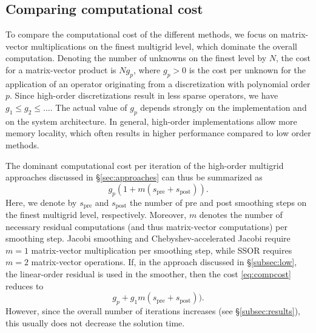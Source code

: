 \documentclass[smallcondensed,final]{svjour3}     %
\begin{document}
\subsection{Comparing computational cost}\label{subsec:complexity}
To compare the computational cost of the different methods, we focus
on matrix-vector multiplications on the finest multigrid level, which
dominate the overall computation. Denoting the number of unknowns on
the finest level by $N$, the cost for a matrix-vector product is
$Ng_p$, where $g_p>0$ is the cost per unknown for the application of
an operator originating from a discretization with polynomial order
$p$. Since high-order discretizations result in less sparse operators,
we have $g_1\le g_2\le \ldots$. The actual value of $g_p$ depends
strongly on the implementation and on the system architecture.
In general, high-order implementations allow more memory locality,
which often results in higher performance compared to low order
methods.

The dominant computational cost per iteration of the high-order
multigrid approaches discussed in \S\ref{sec:approaches} can
thus be summarized as
\begin{equation}\label{eq:compcost}
  g_p(1+m(s_\text{pre}+s_\text{post})).
\end{equation}
Here, we denote by $s_\text{pre}$ and $s_\text{post}$ the number of
pre and post smoothing steps on the finest multigrid level,
respectively. Moreover, $m$ denotes the number of necessary residual
computations (and thus matrix-vector computations) per smoothing step.
Jacobi smoothing and Chebyshev-accelerated Jacobi require $m=1$
matrix-vector multiplication per smoothing step, while SSOR requires
$m=2$ matrix-vector operations. If, in the approach discussed in
\S\ref{subsec:low}, the linear-order residual is used in the
smoother, then the cost \eqref{eq:compcost} reduces to
\begin{equation}\label{eq:compcost2}
  g_p+g_1m(s_\text{pre}+s_\text{post})).
\end{equation}
However, since the overall number of iterations increases (see
\S\ref{subsec:results}), this usually does not decrease the
solution time.
\end{document}
